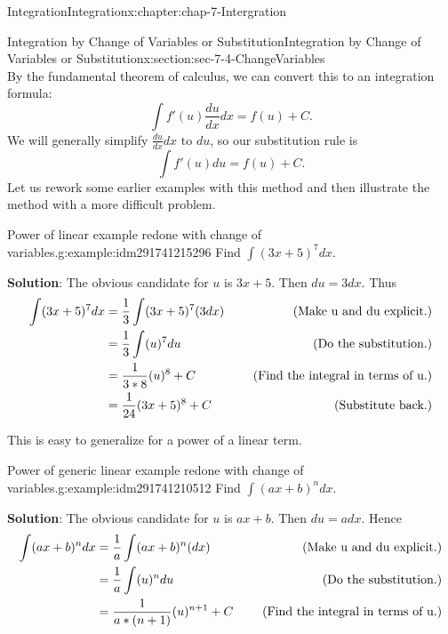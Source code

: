 \documentclass[oneside,10pt,]{book}
\newcommand{\terminology}[1]{\textbf{#1}}
\numberwithin{equation}{section}
\newcommand{\amp}{&}
\begin{document}
\begin{chapterptx}{Integration}{}{Integration}{}{}{x:chapter:chap-7-Intergration}
\begin{sectionptx}{Integration by Change of Variables or Substitution}{}{Integration by Change of Variables or Substitution}{}{}{x:section:sec-7-4-ChangeVariables}
\begin{equation*}
\end{equation*}
By the fundamental theorem of calculus, we can convert this to an integration formula:%
%
\begin{equation*}
\int f' (u)  \frac{du}{dx}  dx=f(u)+C.
\end{equation*}
We will generally simplify \(\frac{du}{dx} dx\) to \(du\), so our substitution rule is%
%
\begin{equation*}
\int f' (u)du=f(u)+C.
\end{equation*}
Let us rework some earlier examples with this method and then illustrate the method with a more difficult problem.%
\begin{example}{Power of linear example redone with change of variables.}{g:example:idm291741215296}%
Find \(\int (3x+5)^7 dx\).%
\par
\terminology{Solution}:  The obvious candidate for \(u\) is \(3x+5\).  Then \(du=3dx\).  Thus%
%
\begin{equation*}
\begin{aligned}  \int (3x+5)^7  dx
\amp =\frac{1}{3} \int (3x+5)^7  (3dx)
\amp \quad \hbox{ (Make u and du explicit.)}\\ 
\amp =\frac{1}{3} \int (u)^7  du
\amp \quad \hbox{ (Do the substitution.)}\\ 
\amp =\frac{1}{3*8} (u)^8+C
\amp \quad \hbox{ (Find the integral in terms of u.)}\\ 
\amp =\frac{1}{24} (3x+5)^8+C
\amp \quad \hbox{ (Substitute back.)}\\ 
\end{aligned}
\end{equation*}
\end{example}
This is easy to generalize for a power of a linear term.%
\begin{example}{Power of generic linear example redone with change of variables.}{g:example:idm291741210512}%
Find \(\int (ax+b)^n dx\).%
\par
\terminology{Solution}:  The obvious candidate for \(u\) is \(ax+b\).  Then \(du=a dx\).  Hence%
%
\begin{equation*}
\begin{aligned}  \int (ax+b)^n dx
\amp =\frac{1}{a} \int (ax+b)^n  (dx)
\amp \quad \hbox{ (Make u and du explicit.)}\\ 
\amp =\frac{1}{a} \int (u)^n  du
\amp \quad \hbox{ (Do the substitution.)}\\ 
\amp =\frac{1}{a*(n+1)} (u)^{n+1}+C
\amp \quad \hbox{ (Find the integral in terms of u.)}\\ 

\end{aligned}
\end{equation*}
\end{example}
\end{sectionptx}
\end{chapterptx}
\end{document}
